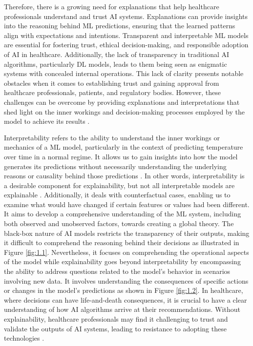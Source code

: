 \documentclass{article}
\begin{document}
Therefore, there is a growing need for explanations that help healthcare professionals understand and trust AI systems. Explanations can provide insights into the reasoning behind ML predictions, ensuring that the learned patterns align with expectations and intentions. Transparent and interpretable ML models are essential for fostering trust, ethical decision-making, and responsible adoption of AI in healthcare. Additionally, the lack of transparency in traditional AI algorithms, particularly DL models, leads to them being seen as enigmatic systems with concealed internal operations. This lack of clarity presents notable obstacles when it comes to establishing trust and gaining approval from healthcare professionals, patients, and regulatory bodies. However, these challenges can be overcome by providing explanations and interpretations that shed light on the inner workings and decision-making processes employed by the model to achieve its results \cite{DBLP:journals/corr/abs-1807-06722}.

Interpretability refers to the ability to understand the inner workings or mechanics of a ML model, particularly in the context of predicting temperature over time in a normal regime. It allows us to gain insights into how the model generates its predictions without necessarily understanding the underlying reasons or causality behind those predictions \cite{doshi2017towards, lipton2018mythos}. In other words, interpretability is a desirable component for explainability, but not all interpretable models are explainable \cite{guidotti2018survey}. Additionally, it deals with counterfactual cases, enabling us to examine what would have changed if certain features or values had been different. It aims to develop a comprehensive understanding of the ML system, including both observed and unobserved factors, towards creating a global theory. The black-box nature of AI models restricts the transparency of their outputs, making it difficult to comprehend the reasoning behind their decisions \cite{lakkaraju2017interpretable} as illustrated in Figure \ref{fig:1.1}. Nevertheless, it focuses on comprehending the operational aspects of the model while explainability goes beyond interpretability by encompassing the ability to address questions related to the model's behavior in scenarios involving new data. It involves understanding the consequences of specific actions or changes in the model's predictions as shown in Figure \ref{fig:1.2}. In healthcare, where decisions can have life-and-death consequences, it is crucial to have a clear understanding of how AI algorithms arrive at their recommendations. Without explainability, healthcare professionals may find it challenging to trust and validate the outputs of AI systems, leading to resistance to adopting these technologies \cite{gilpin2018explaining}.
\end{document}
